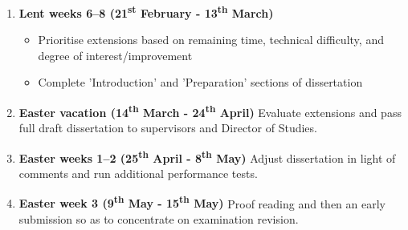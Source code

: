 \documentclass[12pt,a4paper,twoside]{article}
\begin{document}
\begin{enumerate}
\item \textbf{Lent weeks 6--8 (21\textsuperscript{st} February - 13\textsuperscript{th} March)}
  \begin{itemize}
    \item Prioritise extensions based on remaining time, technical difficulty, and degree of interest/improvement
    \item Complete 'Introduction' and 'Preparation' sections of dissertation
  \end{itemize}
\item \textbf{Easter vacation (14\textsuperscript{th} March - 24\textsuperscript{th} April)}
  Evaluate extensions and pass full draft dissertation to supervisors and Director of Studies.

\item \textbf{Easter weeks 1--2 (25\textsuperscript{th} April - 8\textsuperscript{th} May)}
  Adjust dissertation in light of comments and run additional performance tests.

\item \textbf{Easter week 3 (9\textsuperscript{th} May - 15\textsuperscript{th} May)}
  Proof reading and then an early submission so as to concentrate on examination revision.

\end{enumerate}
\end{document}
